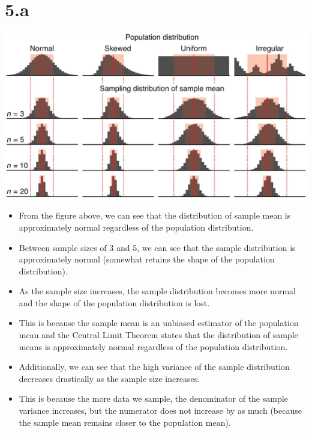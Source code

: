\documentclass[12pt]{article}
\begin{document}
\section*{5.a}
\includegraphics*[width=\linewidth]{graph5a}
\begin{itemize}
    \item From the figure above, we can see that the distribution of sample mean
    is approximately normal regardless of the population distribution.
    \item Between sample sizes of 3 and 5, we can see that the sample distribution
    is approximately normal (somewhat retains the shape of the population distribution).
    \item As the sample size increases, the sample distribution becomes more
    normal and the shape of the population distribution is lost.
    \item This is because the sample mean is an unbiased estimator of the population
    mean and the Central Limit Theorem states that the distribution of sample
    means is approximately normal regardless of the population distribution.
    \item Additionally, we can see that the high variance of the sample distribution
    decreases drastically as the sample size increases.
    \item This is because the more data we sample, the denominator of the sample
    variance increases, but the numerator does not increase by as much (because
    the sample mean remains closer to the population mean).
\end{itemize}

\newpage
\end{document}
